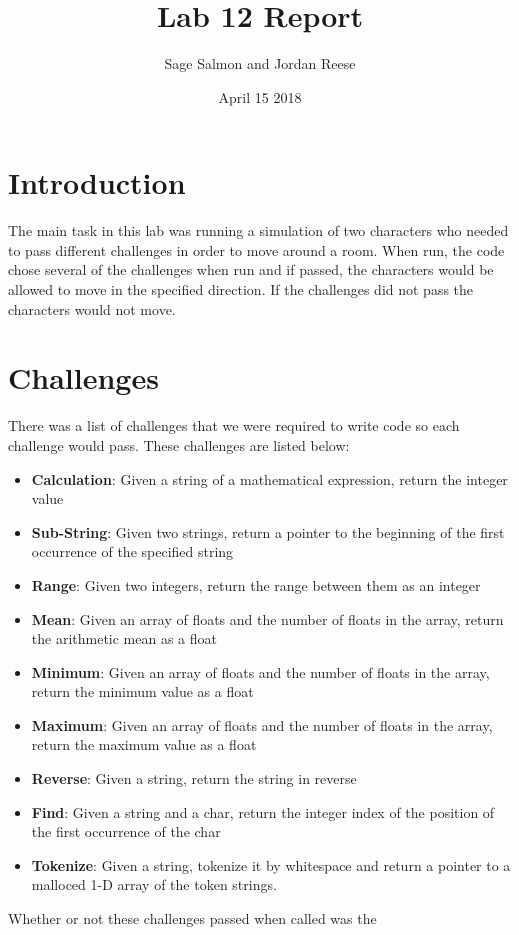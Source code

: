 \documentclass{article} \usepackage[utf8]{inputenc} \title{Lab 12 Report}
\author{Sage Salmon and Jordan Reese } \date{April 15 2018}
\begin{document}
 \maketitle \section*{Introduction} The main task in this 
lab was running a simulation of two characters who needed to pass 
different challenges in order to move around a room. When run, the code 
chose several of the challenges when run and if passed, the characters 
would be allowed to move in the specified direction. If the challenges did 
not pass the characters would not move. \section*{Challenges} There was a 
list of challenges that we were required to write code so each challenge 
would pass. These challenges are listed below: \begin{itemize}
    \item \textbf{Calculation}: Given a string of a mathematical 
expression, return the integer value
    \item \textbf{Sub-String}: Given two strings, return a pointer to the 
beginning of the first occurrence of the specified string
    \item \textbf{Range}: Given two integers, return the range between 
them as an integer
    \item \textbf{Mean}: Given an array of floats and the number of floats 
in the array, return the arithmetic mean as a float
    \item \textbf{Minimum}: Given an array of floats and the number of 
floats in the array, return the minimum value as a float
    \item \textbf{Maximum}: Given an array of floats and the number of 
floats in the array, return the maximum value as a float
    \item \textbf{Reverse}: Given a string, return the string in reverse
    \item \textbf{Find}: Given a string and a char, return the integer 
index of the position of the first occurrence of the char
    \item \textbf{Tokenize}: Given a string, tokenize it by whitespace and 
return a pointer to a malloced 1-D array of the token strings. 
\end{itemize} Whether or not these challenges passed when called was the 
\end{document}
